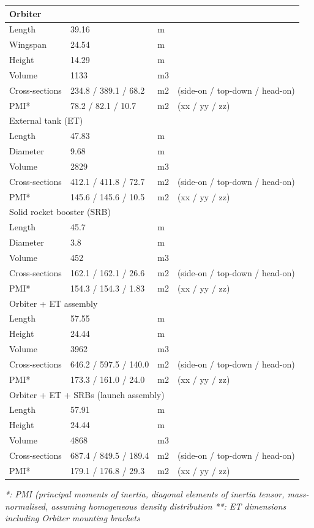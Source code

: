 \begin{table}[H]
\centering
\begin{tabular}{|l|l|l|l|}
\hline
\multicolumn{4}{|l|}{\cellcolor{cyan!10}Orbiter}\\
\hline
Length & 39.16 & m & \\
\hline
Wingspan & 24.54 & m & \\
\hline
Height & 14.29 & m & \\
\hline
Volume & 1133 & m3 & \\
\hline
Cross-sections & 234.8 / 389.1 / 68.2 & m2 & (side-on / top-down / head-on)\\
\hline
PMI* & 78.2 / 82.1 / 10.7 & m2 & (xx / yy / zz)\\
\hline
\multicolumn{4}{|l|}{\cellcolor{yellow!10}External tank (ET)}\\
\hline
Length & 47.83 & m & \\
\hline
Diameter & 9.68 & m & \\
\hline
Volume & 2829 & m3 & \\
\hline
Cross-sections & 412.1 / 411.8 / 72.7 & m2 & (side-on / top-down / head-on)\\
\hline
PMI* & 145.6 / 145.6 / 10.5 & m2 & (xx / yy / zz)\\
\hline
\multicolumn{4}{|l|}{\cellcolor{cyan!10}Solid rocket booster (SRB)}\\
\hline
Length & 45.7 & m & \\
\hline
Diameter & 3.8 & m & \\
\hline
Volume & 452 & m3 & \\
\hline
Cross-sections & 162.1 / 162.1 / 26.6 & m2 & (side-on / top-down / head-on)\\
\hline
PMI* & 154.3 / 154.3 / 1.83 & m2 & (xx / yy / zz)\\
\hline
\multicolumn{4}{|l|}{\cellcolor{yellow!10}Orbiter + ET assembly}\\
\hline
Length & 57.55 & m & \\
\hline
Height & 24.44 & m & \\
\hline
Volume & 3962 & m3 & \\
\hline
Cross-sections & 646.2 / 597.5 / 140.0 & m2 & (side-on / top-down / head-on)\\
\hline
PMI* & 173.3 / 161.0 / 24.0 & m2 & (xx / yy / zz)\\
\hline
\multicolumn{4}{|l|}{\cellcolor{cyan!10}Orbiter + ET + SRBs (launch assembly)}\\
\hline
Length & 57.91 & m & \\
\hline
Height & 24.44 & m & \\
\hline
Volume & 4868 & m3 & \\
\hline
Cross-sections & 687.4 / 849.5 / 189.4 & m2 & (side-on / top-down / head-on)\\
\hline
PMI* & 179.1 / 176.8 / 29.3 & m2 & (xx / yy / zz)\\
\hline
\end{tabular}
\end{table}
\textit{*:	PMI (principal moments of inertia, diagonal elements of inertia tensor, mass-normalised, assuming homogeneous density distribution}
\textit{**:	ET dimensions including Orbiter mounting brackets}

